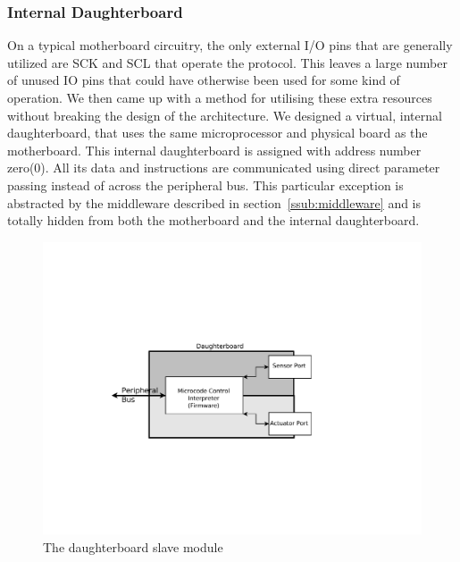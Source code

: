 	\subsubsection{Internal Daughterboard} %
	\label{ssub:internal_daughterboard}
	
	On a typical motherboard circuitry, the only external I/O pins that are generally utilized are SCK and SCL that operate the \iic protocol. This leaves a large number of unused IO pins that could have otherwise been used for some kind of operation. We then came up with a method for utilising these extra resources without breaking the design of the architecture. We designed a virtual, internal daughterboard, that uses the same microprocessor and physical board as the motherboard. This internal daughterboard is assigned with address number zero(0). All its data and instructions are communicated using direct parameter passing instead of across the peripheral bus. This particular exception is abstracted by the middleware described in section~\ref{ssub:middleware} and is totally hidden from both the motherboard and the internal daughterboard.
	
	\begin{figure}[h]
	  \begin{center}
	    \includegraphics[width=1.0\columnwidth]{Figures/db.pdf}
	    \caption{The daughterboard slave module}
	  \end{center}
	\end{figure}
	

